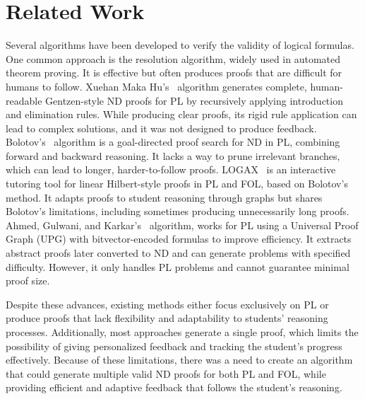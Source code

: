 \section{Related Work}
Several algorithms have been developed to verify the validity of logical formulas. One common approach is the resolution algorithm, widely used in automated theorem proving. It is effective but often produces proofs that are difficult for humans to follow. Xuehan Maka Hu’s~\cite{makahu_automatic} algorithm generates complete, human-readable Gentzen-style ND proofs for PL by recursively applying introduction and elimination rules. While producing clear proofs, its rigid rule application can lead to complex solutions, and it was not designed to produce feedback. Bolotov’s~\cite{bolotov_2005_automated} algorithm is a goal-directed proof search for ND in PL, combining forward and backward reasoning. It lacks a way to prune irrelevant branches, which can lead to longer, harder-to-follow proofs. LOGAX~\cite{lodder_2020_generation} is an interactive tutoring tool for linear Hilbert-style proofs in PL and FOL, based on Bolotov’s method. It adapts proofs to student reasoning through graphs but shares Bolotov’s limitations, including sometimes producing unnecessarily long proofs. Ahmed, Gulwani, and Karkar’s~\cite{IJCAI13} algorithm, works for PL using a Universal Proof Graph (UPG) with bitvector-encoded formulas to improve efficiency. It extracts abstract proofs later converted to ND and can generate problems with specified difficulty. However, it only handles PL problems and cannot guarantee minimal proof size.

Despite these advances, existing methods either focus exclusively on PL or produce proofs that lack flexibility and adaptability to students’ reasoning processes. Additionally, most approaches generate a single proof, which limits the possibility of giving personalized feedback and tracking the student’s progress effectively. Because of these limitations, there was a need to create an algorithm that could generate multiple valid ND proofs for both PL and FOL, while providing efficient and adaptive feedback that follows the student’s reasoning.


